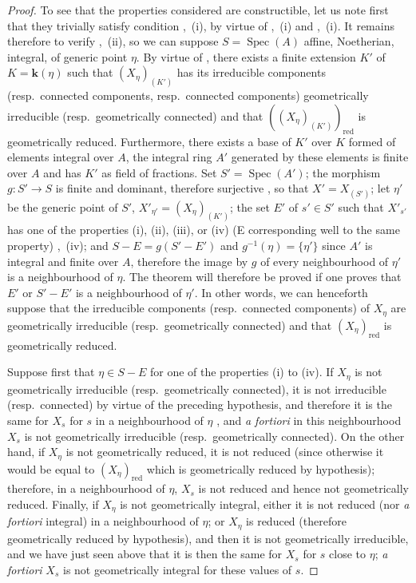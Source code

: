 \begin{proof}
To see that the properties considered are constructible, let us note first that they trivially satisfy condition ,~(i), by virtue of ,~(i) and ,~(i).
It remains therefore to verify ,~(ii), so we can suppose $S=\operatorname{Spec}(A)$ affine, Noetherian, integral, of generic point $\eta$.
By virtue of , there exists a finite extension $K'$ of $K=\boldsymbol{k}(\eta)$ such that $(X_\eta)_{(K')}$ has its irreducible components (resp.\ connected components, resp.\ connected components) geometrically irreducible (resp.\ geometrically connected) and that $((X_\eta)_{(K')})_\mathrm{red}$ is geometrically reduced.
Furthermore, there exists a base of $K'$ over $K$ formed of elements integral over $A$, the integral ring $A'$ generated by these elements is finite over $A$ and has $K'$ as field of fractions.
Set $S'=\operatorname{Spec}(A')$; the morphism $g:S'\to S$ is finite and dominant, therefore surjective , so that $X'=X_{(S')}$; let $\eta'$ be the generic point of $S'$, $X'_{\eta'}=(X_\eta)_{(K')}$; the set $E'$ of $s'\in S'$ such that $X'_{s'}$ has one of the properties (i), (ii), (iii), or (iv) (E corresponding well to the same property) ,~(iv); and $S-E=g(S'-E')$ and $g^{-1}(\eta)=\{\eta'\}$ since $A'$ is integral and finite over $A$, therefore the image by $g$ of every neighbourhood of $\eta'$ is a neighbourhood of $\eta$.
The theorem will therefore be proved if one proves that $E'$ or $S'-E'$ is a neighbourhood of $\eta'$.
In other words, we can henceforth suppose that the irreducible components (resp.\ connected components) of $X_\eta$ are geometrically irreducible (resp.\ geometrically connected) and that $(X_\eta)_\mathrm{red}$ is geometrically reduced.


Suppose first that $\eta\in S-E$ for one of the properties (i) to (iv).
If $X_\eta$ is not geometrically irreducible (resp.\ geometrically connected), it is not irreducible (resp.\ connected) by virtue of the preceding hypothesis, and therefore it is the same for $X_s$ for $s$ in a neighbourhood of $\eta$ , and \emph{a fortiori} in this neighbourhood $X_s$ is not geometrically irreducible (resp.\ geometrically connected).
On the other hand, if $X_\eta$ is not geometrically reduced, it is not reduced (since otherwise it would be equal to $(X_\eta)_\mathrm{red}$ which is geometrically reduced by hypothesis); therefore, in a neighbourhood of $\eta$, $X_s$ is not reduced  and hence not geometrically reduced.
Finally, if $X_\eta$ is not geometrically integral, either it is not reduced (nor \emph{a fortiori} integral) in a neighbourhood of $\eta$; or $X_\eta$ is reduced (therefore geometrically reduced by hypothesis), and then it is not geometrically irreducible, and we have just seen above that it is then the same for $X_s$ for $s$ close to $\eta$; \emph{a fortiori} $X_s$ is not geometrically integral for these values of $s$.


\end{proof}
